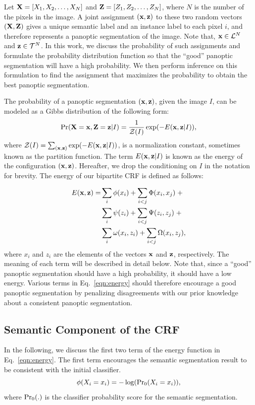 Let $\mathbf{X} = [X_1, X_2, \dots, X_N ]$ and $\mathbf{Z} = [Z_1, Z_2, \dots, Z_N
]$, where $N$ is the number of the pixels in the image. A joint assignment $(\mathbf{x}, \mathbf{z})$ to these two random vectors $(\mathbf{X}, \mathbf{Z})$ gives a unique semantic label and an instance label to each pixel $i$, and therefore represents a panoptic segmentation of the image. Note that, $\mathbf{x} \in \mathcal{L}^N$ and $\mathbf{z} \in \mathcal{T}^N$. In this work, we discuss the probability of such assignments and formulate the probability distribution function so that the ``good'' panoptic segmentation will have a high probability. We then perform inference on this formulation to find the assignment that maximizes the probability to obtain the best panoptic segmentation.

The probability of a panoptic segmentation $(\mathbf{x}, \mathbf{z})$, given the image $I$, can be modeled as a Gibbs distribution of the following form:
\begin{equation}
\label{eqn:prob}
\Pr(\mathbf{X} = \mathbf{x}, \mathbf{Z} = \mathbf{z}|I) = \frac{1}{\mathcal{Z}(I)}\exp(-E(\mathbf{x}, \mathbf{z}|I)),
\end{equation}
where $\mathcal{Z}(I) = \sum_{(\mathbf{x},\mathbf{z})} \exp(-E(\mathbf{x}, \mathbf{z}|I))$, is a normalization constant, sometimes known as the partition function. The term $E(\mathbf{x}, \mathbf{z}|I)$ is known as the energy of the configuration $(\mathbf{x}, \mathbf{z})$. Hereafter, we drop the conditioning on $I$ in the notation for brevity. The energy of our bipartite CRF is defined as follows:

\begin{equation}
\label{eqn:energy}
\begin{split}
E(\mathbf{x}, \mathbf{z}) =& \sum_i\phi(x_i) + \sum_{i < j}\Phi(x_i, x_j) \;+ \\
& \sum_i\psi(z_i) + \sum_{i < j}\Psi(z_i, z_j) \; + \\
& \sum_i\omega(x_i, z_i) + \sum_{i < j}\Omega(x_i, z_j),
\end{split}
\end{equation}
where $x_i$ and $z_i$ are the elements of the vectors $\mathbf{x}$ and $\mathbf{z}$, respectively. The meaning of each term will be described in detail below. Note that, since a ``good'' panoptic segmentation should have a high probability, it should have a low energy. Various terms in Eq.~\eqref{eqn:energy} should therefore encourage a good panoptic segmentation by penalizing disagreements with our prior knowledge about a consistent panoptic segmentation. %

\subsection{Semantic Component of the CRF}
In the following, we discuss the first two term of the energy function in Eq.~\eqref{eqn:energy}. The first term encourages the semantic segmentation result to be consistent with the initial classifier.
\begin{equation}
\phi(X_i = x_i) = - \log(\operatorname{Pr_0}(X_i = x_i)),
\end{equation}
where $\operatorname{Pr_0}(.)$ is the classifier probability score for the semantic segmentation. 

